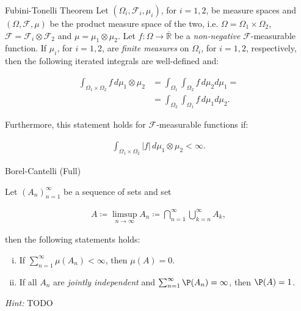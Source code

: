 \documentclass[10pt,landscape]{article}
\newcommand{\Hint}{\textit{Hint: }}
\newcommand{\CalF}{\mathcal{F}}
\begin{document}
\begin{multicols}{3}
\begin{theorem}{6.7}{Fubini-Tonelli Theorem}
    Let $(\Omega_i, \CalF_i, \mu_i)$, for $i = 1,2$, be measure spaces and $(\Omega, \CalF, \mu)$ be the product measure space of the two, i.e. $\Omega = \Omega_1 \times \Omega_2$, $\CalF = \CalF_i \otimes \CalF_2$ and $\mu = \mu_1 \otimes \mu_2$. Let $f: \Omega \to \overline{\mathbb{R}}$ be a \emph{non-negative} $\CalF$-measurable function. If $\mu_i$, for $i = 1,2$, are \emph{finite measures} on $\Omega_i$, for $i = 1,2$, respectively, then the following iterated integrals are well-defined and:

        \begin{align*}
            \int_{\Omega_1 \times \Omega_2} f \, d\mu_1 \otimes \mu_2 &= \int_{\Omega_1} \int_{\Omega_2} f \, d\mu_2 d\mu_1 = \\ &= \int_{\Omega_2} \int_{\Omega_1} f \, d\mu_1 d\mu_2.
        \end{align*}

    Furthermore, this statement holds for $\CalF$-measurable functions if:

        \begin{align*}
            \int_{\Omega_1 \times \Omega_2} |f| \, d\mu_1 \otimes \mu_2 < \infty.
        \end{align*}

\end{theorem}

\begin{lemma}{6.9}{Borel-Cantelli (Full)}

    Let $(A_n)_{n=1}^{\infty}$ be a sequence of sets and set

        \begin{align*}
            A \coloneqq \limsup_{n \to \infty} A_n \coloneqq \bigcap_{n=1}^{\infty}\bigcup_{k=n}^{\infty} A_k,
        \end{align*}

    then the following statements holds:

        \begin{enumerate}[(i)]
            \item If $\sum_{n=1}^{\infty} \mu(A_n) < \infty$, then $\mu(A) = 0$.
            \item If all $A_n$ are \emph{jointly independent} and $\sum_{n=1}^{\infty} \P(A_n) = \infty$, then $\P(A) = 1$.
        \end{enumerate}

    \Hint TODO
    
\end{lemma}



\end{multicols}
\end{document}

